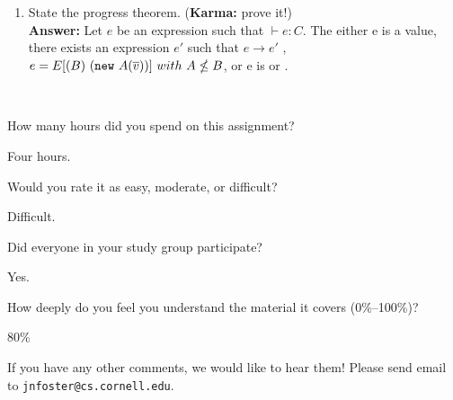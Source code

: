 \documentclass[10pt]{article}
\begin{document}
\begin{exercise}
\begin{enumerate}
\item State the progress theorem. (\textbf{Karma:} prove it!)\\[0.3cm]
\noindent \textbf{Answer:} Let $e$ be an expression such that $\vdash e: C.$ The either e is a value, there exists an expression $e'$ such that $e \rightarrow e'$ , $e = E[(B) \ (\kw{new}~A(\ol{v}))] \ with \ A \nleq B$, or e is  or .


\end{enumerate}
\end{exercise}

\begin{debriefing} \hfill\\[-4ex]
\begin{enumerate*}
\item How many hours did you spend on this assignment? 

Four hours.
\item Would you rate it as easy, moderate, or difficult? 

Difficult.
\item Did everyone in your study group participate? 

Yes.
\item How deeply do you feel you understand the material it covers (0\%--100\%)? 

80\%
\item If you have any other comments, we would like to hear them!
  Please send email to \texttt{jnfoster@cs.cornell.edu}.
\end{enumerate*}
\end{debriefing}
\end{document}
